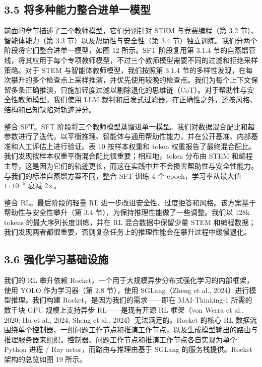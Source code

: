 \subsection{3.5 将多种能力整合进单一模型}\label{consolidating-capabilities-into-a-single-model}

前面的章节描述了三个教师模型，它们分别针对 STEM 与竞赛编程（第 3.2 节）、智能体能力（第 3.3 节）以及帮助性与安全性（第 3.4 节）独立训练。我们分两个阶段将它们整合进单一模型，如图 12 所示。SFT 阶段复用第 3.1.4 节的自蒸馏管线，将其应用于每个专项教师模型，不过三个教师模型需要不同的过滤和拒绝采样策略。对于 STEM 与智能体教师模型，我们按照第 3.1.4 节的多样性发现，在每次攀升的多个检查点上采样推演，并优先使用较晚的检查点。我们为每个上下文保留多条正确推演，只施加轻度过滤以剔除退化的思维链（CoT）。对于帮助性与安全性教师模型，我们使用 LLM 裁判和启发式过滤器，在正确性之外，还按风格、结构和已知缺陷对轨迹评分。

整合 SFT。SFT 阶段将三个教师模型蒸馏进单一模型。我们对数据混合配比和超参数进行了迭代，以平衡推理、智能体与通用帮助性能力，并在公开基准、内部基准和人工评估上进行验证。表 10 按样本权重和 token 权重报告了最终混合配比。我们发现按样本权重平衡混合配比很重要；相应地，token 分布由 STEM 和编程主导，这是因为它们的轨迹更长，而这在实践中并不会损害帮助性与安全性能力。与我们的标准自蒸馏方案不同，整合 SFT 训练 4 个 epoch，学习率从最大值 $1\cdot10^{-5}$ 衰减 2$\times$。

整合 RL。最后阶段的轻量 RL 进一步改进安全性、过度拒答和风格。该方案基于帮助性与安全性攀升（第 3.4 节），为保持推理性能做了一些调整。我们以 128k tokens 的最大序列长度训练，并在 RL 混合数据中保留少量 STEM 和编程数据；我们发现两者都很重要，否则复杂任务上的推理性能会在攀升过程中缓慢退化。

\subsection{3.6 强化学习基础设施}\label{reinforcement-learning-infrastructure}

我们的 RL 攀升依赖 Rocket，一个用于大规模异步分布式强化学习的内部框架，使用 YOLO 作为学习器（第 2.8 节），使用 SGLang（Zheng et al., 2024）进行模型推理。我们构建 Rocket，是因为我们的需求——即在 MAI-Thinking-1 所需的数千块 GPU 规模上支持异步 RL——是现有开源 RL 框架（von Werra et al., 2020; Hu et al., 2024; Sheng et al., 2024）无法满足的。Rocket 的核心 RL 数据流围绕单个控制器、一组问题工作节点和推演工作节点，以及生成模型输出的路由与推理服务器来组织。控制器、问题工作节点和推演工作节点各自实现为单个 Python 进程 / Ray actor，而路由与推理由基于 SGLang 的服务栈提供。Rocket 架构的总览如图 19 所示。



